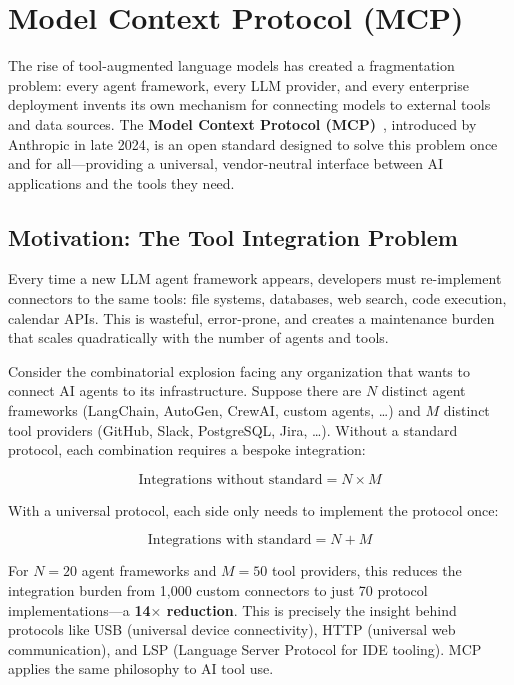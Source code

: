 \chapter{Model Context Protocol (MCP)}
\label{sec:mcp}

The rise of tool-augmented language models has created a fragmentation problem: every agent framework, every LLM provider, and every enterprise deployment invents its own mechanism for connecting models to external tools and data sources. The \textbf{Model Context Protocol (MCP)}~\cite{anthropic-mcp-2024}, introduced by Anthropic in late 2024, is an open standard designed to solve this problem once and for all---providing a universal, vendor-neutral interface between AI applications and the tools they need.

\section{Motivation: The Tool Integration Problem}
\label{sec:mcp:motivation}

\begin{intuitionbox}
Every time a new LLM agent framework appears, developers must re-implement connectors to the same tools: file systems, databases, web search, code execution, calendar APIs. This is wasteful, error-prone, and creates a maintenance burden that scales quadratically with the number of agents and tools.
\end{intuitionbox}

Consider the combinatorial explosion facing any organization that wants to connect AI agents to its infrastructure. Suppose there are $N$ distinct agent frameworks (LangChain, AutoGen, CrewAI, custom agents, \ldots{}) and $M$ distinct tool providers (GitHub, Slack, PostgreSQL, Jira, \ldots{}). Without a standard protocol, each combination requires a bespoke integration:

\begin{equation}
\text{Integrations without standard} = N \times M
\end{equation}

With a universal protocol, each side only needs to implement the protocol once:

\begin{equation}
\text{Integrations with standard} = N + M
\end{equation}

For $N = 20$ agent frameworks and $M = 50$ tool providers, this reduces the integration burden from 1,000 custom connectors to just 70 protocol implementations---a \textbf{14$\times$ reduction}. This is precisely the insight behind protocols like USB (universal device connectivity), HTTP (universal web communication), and LSP (Language Server Protocol for IDE tooling). MCP applies the same philosophy to AI tool use.

